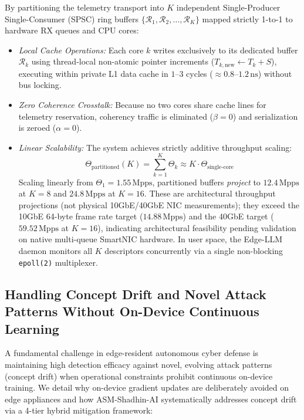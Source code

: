 \documentclass[journal]{IEEEtran}
\renewcommand{\_}{\textunderscore\allowbreak}
\begin{document}
\begin{enumerate}
  By partitioning the telemetry transport into $K$ independent Single-Producer Single-Consumer (SPSC) ring buffers $\{\mathcal{R}_1, \mathcal{R}_2, \dots, \mathcal{R}_K\}$ mapped strictly 1-to-1 to hardware RX queues and CPU cores:
  \begin{itemize}
    \item \textit{Local Cache Operations:} Each core $k$ writes exclusively to its dedicated buffer $\mathcal{R}_k$ using thread-local non-atomic pointer increments ($T_{k,\text{new}} \leftarrow T_k + S$), executing within private L1 data cache in $1$--$3$ cycles (${\approx}0.8$--$1.2\,\text{ns}$) without bus locking.
    \item \textit{Zero Coherence Crosstalk:} Because no two cores share cache lines for telemetry reservation, coherency traffic is eliminated ($\beta = 0$) and serialization is zeroed ($\alpha = 0$).
    \item \textit{Linear Scalability:} The system achieves strictly additive throughput scaling:
    \begin{equation}
      \Theta_{\text{partitioned}}(K) = \sum_{k=1}^K \Theta_k \approx K \cdot \Theta_{\text{single-core}}
      \label{eq:partitioned_scaling}
    \end{equation}
    Scaling linearly from $\Theta_1 = 1.55\,\text{Mpps}$, partitioned buffers \textit{project} to
    $12.4\,\text{Mpps}$ at $K=8$ and $24.8\,\text{Mpps}$ at $K=16$. These are architectural
    throughput projections (not physical 10GbE/40GbE NIC measurements); they exceed the
    10GbE 64-byte frame rate target ($14.88\,\text{Mpps}$) and the 40GbE target
    ($59.52\,\text{Mpps}$ at $K=16$), indicating architectural feasibility pending
    validation on native multi-queue SmartNIC hardware.
    In user space, the Edge-LLM daemon monitors all $K$ descriptors concurrently via a
    single non-blocking \texttt{epoll(2)} multiplexer.
  \end{itemize}
\end{enumerate}

\subsection{Handling Concept Drift and Novel Attack Patterns Without On-Device Continuous Learning}
A fundamental challenge in edge-resident autonomous cyber defense is maintaining high detection efficacy against novel, evolving attack patterns (concept drift) when operational constraints prohibit continuous on-device training. We detail why on-device gradient updates are deliberately avoided on edge appliances and how ASM-Shadhin-AI systematically addresses concept drift via a 4-tier hybrid mitigation framework:
\end{document}
